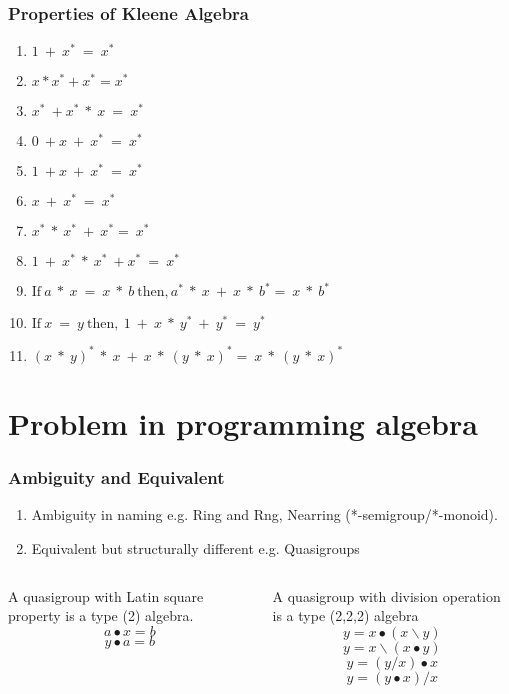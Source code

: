 \documentclass[xcolor={dvipsnames}]{beamer}
\begin{document}
\begin{frame}[fragile]
    \frametitle{Properties of Kleene Algebra}  
        \begin{enumerate}
            \item $1\ +\ x^{*}\ =\ x^{*}$
            \item $x * x^{*} + x^{*} = x^{*}$
            \item $x^{*}\  + x^{*}\ *\ x\ =\ x^{*}$
            \item $0\ + x\ +\ x^{*}\ =\ x^{*}$
            \item $1\ + x\ +\ x^{*}\ =\ x^{*}$
            \item $x\ +\ x^{*}\ =\ x^{*}$
            \item $x^{*}\ *\ x^{*}\ +\ x^{*} =\ x^{*}$
            \item $1 \ +\ x^{*}\ *\ x^{*}\ + x^{*}\ =\ x^{*}$
            \item $\text{If}\ a\ *\ x\ =\ x\ *\ b\ \text{then}, a^{*}\ *\ x\ +\ x\ *\ b^{*} =\ x\ *\ b^{*}$
            \item $\text{If}\ x\ =\ y\ \text{then},\ 1\ +\ x\ *\ y^{*}\ + \ y^{*}\ =\ y^{*}$
            \item $(x\ *\ y)^{*}\ *\ x\ +\ x\ *\ (y\ *\ x)^{*} =\ x\ *\ (y\ *\ x)^{*}$
            \end{enumerate}
  \end{frame}
\section{Problem in programming algebra}

\begin{frame}
  \frametitle{Ambiguity and Equivalent}
  \begin{enumerate}
    \item Ambiguity in naming e.g. Ring and Rng, Nearring (*-semigroup/*-monoid). 
    \item Equivalent but structurally different e.g. Quasigroups
  \end{enumerate}
  \begin{columns}
    \begin{column}{0.4\textwidth}
      A quasigroup with Latin square property is a type (2) algebra.
      \[a ∙ x = b\]
      \[y ∙ a = b\]
    \end{column}
    \begin{column}{0.575\textwidth}
      A quasigroup with division operation is a type (2,2,2) algebra
      \[y=x∙(x\backslash y)\]
      \[y=x\backslash(x∙y)\]
      \[y=(y/x)∙x\]
      \[y=(y∙x)/x\]
    \end{column}
  \end{columns}
\end{frame}
\end{document}
